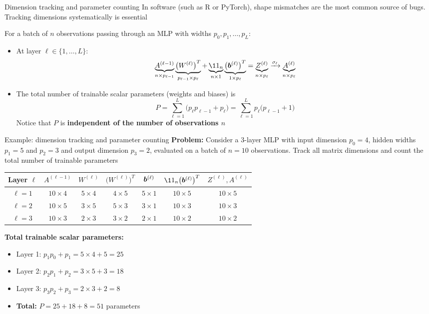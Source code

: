 \documentclass[aspectratio=169]{beamer}\usepackage[]{graphicx}\usepackage[]{xcolor}
\begin{document}
\begin{frame}{Dimension tracking and parameter counting}
In software (such as R or PyTorch), shape mismatches are the most common source of bugs. Tracking dimensions systematically is essential
\vfill
\begin{proposition}
For a batch of $n$ observations passing through an MLP with widths $p_0, p_1, \ldots, p_L$:
\begin{itemize}
\item At layer $\ell \in \{1, \ldots, L\}$:
\[
\underbrace{A^{(\ell-1)}}_{n \times p_{\ell-1}}
\underbrace{\big(W^{(\ell)}\big)^T}_{p_{\ell-1} \times p_\ell}
+
\underbrace{\11_n}_{n \times 1}
\underbrace{\big(\bb^{(\ell)}\big)^T}_{1 \times p_\ell}
=
\underbrace{Z^{(\ell)}}_{n \times p_\ell}
\xrightarrow{\sigma_\ell}
\underbrace{A^{(\ell)}}_{n \times p_\ell}
\]
\item The total number of trainable scalar parameters (weights and biases) is
\[
P = \sum_{\ell=1}^L \big(p_\ell p_{\ell-1} + p_\ell\big) = \sum_{\ell=1}^L p_\ell\big(p_{\ell-1} + 1\big)
\]
Notice that $P$ is \textbf{independent of the number of observations $n$}
\end{itemize}
\end{proposition}
\end{frame}


\begin{frame}{Example: dimension tracking and parameter counting}
\textbf{Problem:} Consider a 3-layer MLP with input dimension $p_0 = 4$, hidden widths $p_1 = 5$ and $p_2 = 3$ and output dimension $p_3 = 2$, evaluated on a batch of $n = 10$ observations. Track all matrix dimensions and count the total number of trainable parameters
\vfill
\begin{center}
\renewcommand{\arraystretch}{1.25}
\begin{tabular}{ccccccc}
\toprule
Layer $\ell$ & $A^{(\ell-1)}$ & $W^{(\ell)}$ & $\big(W^{(\ell)}\big)^T$ & $\bm{b}^{(\ell)}$ & $\11_n\big(\bb^{(\ell)}\big)^T$ & $Z^{(\ell)}, A^{(\ell)}$ \\
\midrule
$\ell = 1$ & $10 \times 4$ & $5 \times 4$ & $4 \times 5$ & $5 \times 1$ & $10 \times 5$ & $10 \times 5$ \\
$\ell = 2$ & $10 \times 5$ & $3 \times 5$ & $5 \times 3$ & $3 \times 1$ & $10 \times 3$ & $10 \times 3$ \\
$\ell = 3$ & $10 \times 3$ & $2 \times 3$ & $3 \times 2$ & $2 \times 1$ & $10 \times 2$ & $10 \times 2$ \\
\bottomrule
\end{tabular}
\end{center}
\vfill
\textbf{Total trainable scalar parameters:}
\begin{itemize}
\item Layer 1: $p_1 p_0 + p_1 = 5 \times 4 + 5 = 25$
\item Layer 2: $p_2 p_1 + p_2 = 3 \times 5 + 3 = 18$
\item Layer 3: $p_3 p_2 + p_3 = 2 \times 3 + 2 = 8$
\item \textbf{Total:} $P = 25 + 18 + 8 = 51$ parameters
\end{itemize}
\end{frame}
\end{document}

